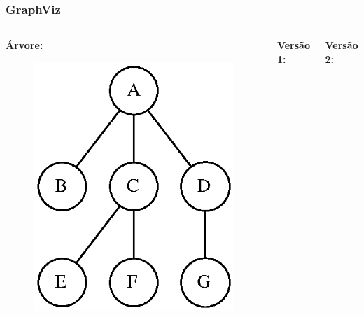 \documentclass[aspectratio=169]{beamer}
\begin{document}
\begin{frame}[fragile]\frametitle{GraphViz}
\begin{columns}[T]
\begin{column}{0.3\linewidth}
\textbf{\underline{Árvore:}}\\
\begin{figure}[h]
	\centering
	\includegraphics[height=0.4\paperheight]{imagens/arvore_a.eps}
\end{figure}
\end{column}
\begin{column}{0.35\linewidth}
\textbf{\underline{Versão 1:}}\\

\end{column}
\begin{column}{0.35\linewidth}
\textbf{\underline{Versão 2:}}\\

\end{column}
\end{columns}
\end{frame}

\end{document}
